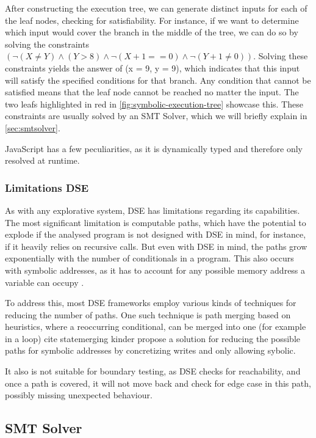 After constructing the execution tree, we can generate distinct inputs for each of the leaf nodes, checking for satisfiability.
For instance, if we want to determine which input would cover the branch in the middle of the tree, we can do so by solving the constraints  $(\neg(X \neq Y) \land (Y > 8) \land \neg( X+1==0 ) \land \neg(Y+1 \neq 0 ))$. 
Solving these constraints yields the answer of (x = 9, y = 9), which indicates that this input will satisfy the specified conditions for that branch. 
Any condition that cannot be satisfied means that the leaf node cannot be reached no matter the input. The two leafs highlighted in red in  \autoref{fig:symbolic-execution-tree} showcase this.
These constraints are usually solved by an SMT Solver, which we will briefly explain in \autoref{sec:smtsolver}.


JavaScript has a few peculiarities, as it is dynamically typed and therefore only resolved at runtime. 

\subsubsection{Limitations DSE}

As with any explorative system, DSE has limitations regarding its capabilities. 
The most significant limitation is computable paths, which have the potential to explode if the analysed program is not designed with DSE in mind, for instance, if it heavily relies on recursive calls. 
But even with DSE in mind, the paths grow exponentially with the number of conditionals in a program.  \cite{cadar_symbolic_2013}
This also occurs with symbolic addresses, as it has to account for any possible memory address a variable can occupy \cite{elkarablieh_precise_2009}.  

To address this, most DSE frameworks employ various kinds of techniques for reducing the number of paths. 
One such technique is path merging based on heuristics, where a reoccurring conditional, can be merged into one (for example in a loop)   cite statemerging kinder%
\citet{cha_unleashing_2012} propose a solution for reducing the possible paths for symbolic addresses by concretizing writes and only allowing sybolic.    

It also is not suitable for boundary testing, as DSE checks for reachability, and once a path is covered, it will not move back and check for edge case in this path, possibly missing unexpected behaviour. \cite{berthier_efficient_2023}


\FloatBarrier
\subsection{SMT Solver}
\label{sec:smtsolver}

